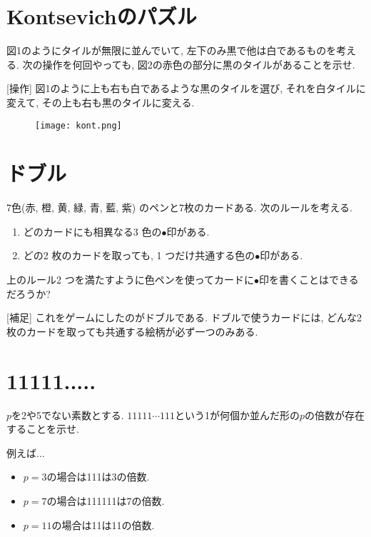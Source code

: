 \documentclass[dvipdfmx,a4paper,12pt]{article} %
\theoremstyle{definition}
\theoremstyle{remark}
\numberwithin{equation}{section}
\begin{document}
\section{Kontsevichのパズル}
図1のようにタイルが無限に並んでいて, 左下のみ黒で他は白であるものを考える.
次の操作を何回やっても, 図2の赤色の部分に黒のタイルがあることを示せ. 

\vspace{5pt}
[操作] 図1のように上も右も白であるような黒のタイルを選び, それを白タイルに変えて, その上も右も黒のタイルに変える.

\begin{figure}[htbp]
\begin{center}
\texttt{[image: kont.png]}
\end{center}
\end{figure}


\section{ドブル}
7色(赤, 橙, 黄, 緑, 青, 藍, 紫) のペンと7枚のカードある. 次のルールを考える.
\begin{enumerate}
    \setlength{\parskip}{0cm} 
  \setlength{\itemsep}{0cm} 
\item どのカードにも相異なる3 色の$\bullet$印がある.
\item どの2 枚のカードを取っても, 1 つだけ共通する色の$\bullet$印がある.
\end{enumerate}
上のルール2 つを満たすように色ペンを使ってカードに$\bullet$印を書くことはできるだろうか?

[補足] これをゲームにしたのがドブルである. ドブルで使うカードには, どんな2枚のカードを取っても共通する絵柄が必ず一つのみある. 

\section{11111.....}
$p$を2や5でない素数とする. 
$11111\cdots 111$という1が何個か並んだ形の$p$の倍数が存在することを示せ.

\vspace{10pt}
例えば...
\begin{itemize}
    \setlength{\parskip}{0cm} 
  \setlength{\itemsep}{0cm} 
  \item $p=3$の場合は111は3の倍数.
  \item $p=7$の場合は111111は7の倍数.
  \item $p=11$の場合は11は11の倍数.
  \end{itemize}
  
\end{document}
